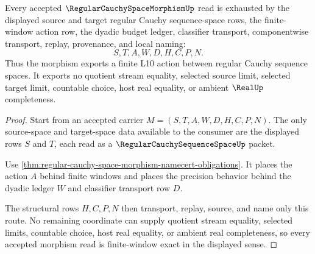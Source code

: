 \begin{theorem}
\label{thm:regular-cauchy-space-morphism-finite-window-exactness}
Every accepted $\RegularCauchySpaceMorphismUp$ read is exhausted by the displayed source and target regular Cauchy sequence-space rows, the finite-window action row, the dyadic budget ledger, classifier transport, componentwise transport, replay, provenance, and local naming:
$$
S,T,A,W,D,H,C,P,N.
$$
Thus the morphism exports a finite L10 action between regular Cauchy sequence spaces. It exports no quotient stream equality, selected source limit, selected target limit, countable choice, host real equality, or ambient $\RealUp$ completeness.
\end{theorem}
\begin{proof}
Start from an accepted carrier $M=(S,T,A,W,D,H,C,P,N)$. The only source-space and target-space data available to the consumer are the displayed rows $S$ and $T$, each read as a $\RegularCauchySequenceSpaceUp$ packet.

Use \autoref{thm:regular-cauchy-space-morphism-namecert-obligations}. It places the action $A$ behind finite windows and places the precision behavior behind the dyadic ledger $W$ and classifier transport row $D$.

The structural rows $H,C,P,N$ then transport, replay, source, and name only this route. No remaining coordinate can supply quotient stream equality, selected limits, countable choice, host real equality, or ambient real completeness, so every accepted morphism read is finite-window exact in the displayed sense.
\end{proof}


\begin{closurestatus}{\RegularCauchySpaceMorphismUp}
  \theoryclosure{\seedClosure}
  \formalstatus{\unformalizedV}
\end{closurestatus}
